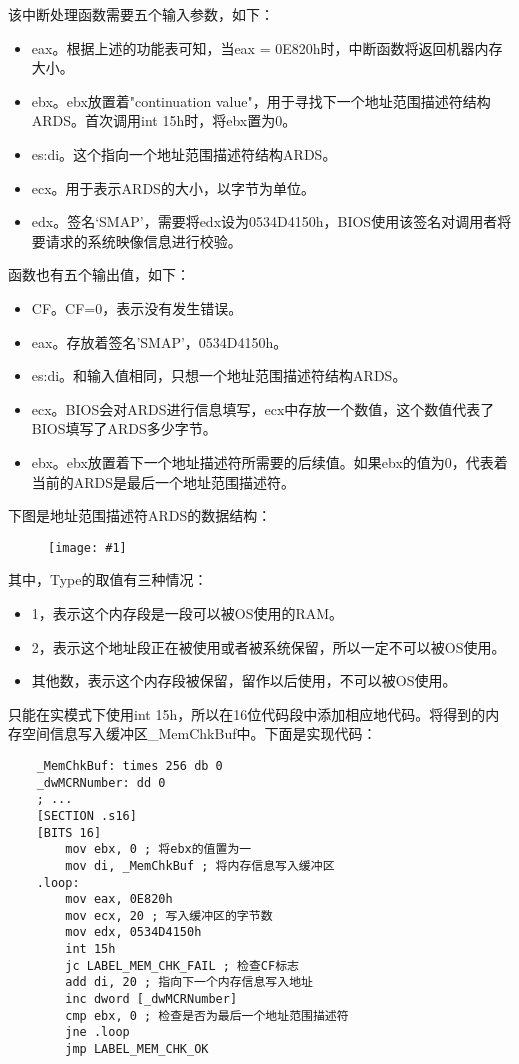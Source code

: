 \documentclass[a4paper,left=2.5cm,right=2.5cm,11pt]{article}
\newcommand{\fic}[1]{\begin{figure}[H]
		\center
		\texttt{[image: \#1]}
	\end{figure}}
\begin{document}
	该中断处理函数需要五个输入参数，如下：
	\begin{itemize}
		\item eax。根据上述的功能表可知，当eax = 0E820h时，中断函数将返回机器内存大小。
		\item ebx。ebx放置着"continuation value"，用于寻找下一个地址范围描述符结构ARDS。首次调用int 15h时，将ebx置为0。
		\item es:di。这个指向一个地址范围描述符结构ARDS。
		\item ecx。用于表示ARDS的大小，以字节为单位。
		\item edx。签名‘SMAP’，需要将edx设为0534D4150h，BIOS使用该签名对调用者将要请求的系统映像信息进行校验。
	\end{itemize}

	函数也有五个输出值，如下：
	\begin{itemize}
		\item CF。CF=0，表示没有发生错误。
		\item eax。存放着签名'SMAP'，0534D4150h。
		\item es:di。和输入值相同，只想一个地址范围描述符结构ARDS。
		\item ecx。BIOS会对ARDS进行信息填写，ecx中存放一个数值，这个数值代表了BIOS填写了ARDS多少字节。
		\item ebx。ebx放置着下一个地址描述符所需要的后续值。如果ebx的值为0，代表着当前的ARDS是最后一个地址范围描述符。
	\end{itemize}

	下图是地址范围描述符ARDS的数据结构：
	\fic{7.png}

	其中，Type的取值有三种情况：
	\begin{itemize}
		\item 1，表示这个内存段是一段可以被OS使用的RAM。
		\item 2，表示这个地址段正在被使用或者被系统保留，所以一定不可以被OS使用。
		\item 其他数，表示这个内存段被保留，留作以后使用，不可以被OS使用。
	\end{itemize}

	只能在实模式下使用int 15h，所以在16位代码段中添加相应地代码。将得到的内存空间信息写入缓冲区_MemChkBuf中。下面是实现代码：
	\begin{lstlisting}
	_MemChkBuf: times 256 db 0
	_dwMCRNumber: dd 0
	; ...
	[SECTION .s16]
	[BITS 16]
		mov ebx, 0 ; 将ebx的值置为一
		mov di, _MemChkBuf ; 将内存信息写入缓冲区
	.loop:
		mov eax, 0E820h
		mov ecx, 20 ; 写入缓冲区的字节数
		mov edx, 0534D4150h
		int 15h
		jc LABEL_MEM_CHK_FAIL ; 检查CF标志
		add di, 20 ; 指向下一个内存信息写入地址
		inc dword [_dwMCRNumber]
		cmp ebx, 0 ; 检查是否为最后一个地址范围描述符
		jne .loop
		jmp LABEL_MEM_CHK_OK
	\end{lstlisting}
\end{document}

